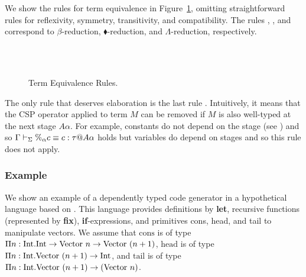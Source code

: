 We show the rules for term equivalence in
Figure~\ref{fig:term-equivalence-rules}, omitting straightforward rules for
reflexivity, symmetry, transitivity, and compatibility.  The rules \QBeta,
\QTBLTB, and \QLambda{} correspond to $\beta$-reduction,
$\blacklozenge$-reduction, and $\Lambda$-reduction, respectively.

\begin{figure}[tbp]
    \begin{center}
    \\[2mm]
     \\[2mm]
     \hfil
    \caption{Term Equivalence Rules.}
    \label{fig:term-equivalence-rules}
  \end{center}
\end{figure}


The only rule that deserves elaboration is the last rule \QPercent.
Intuitively, it means that the CSP operator applied to term $M$ can be
removed if $M$ is also well-typed at the next stage \(A\alpha\).
For example, constants do not depend on the stage (see \TConst) and
so \(\Gamma\vdash_\Sigma \%_\alpha c \equiv c : \tau @ A\alpha\) holds but variables
do depend on stages and so this rule does not apply.

\subsubsection{Example}

We show an example of a dependently typed code generator in a
hypothetical language based on \LTP.  
This language provides definitions by \textbf{let},
recursive functions (represented by \textbf{fix}), \textbf{if}-expressions,
and primitives cons, head, and tail to manipulate vectors. We assume that
$\text{cons}$ is of type $\Pi n:\textrm{Int}.\textrm{Int} \to \text{Vector}\ n \to \text{Vector}\ (n+1)$, 
$\text{head}$ is of type $\Pi n:\textrm{Int}.\text{Vector}\ (n+1) \to \textrm{Int}$, and
$\text{tail}$ is of type $\Pi n:\textrm{Int}.\text{Vector}\ (n+1) \to (\text{Vector}\ n)$.


